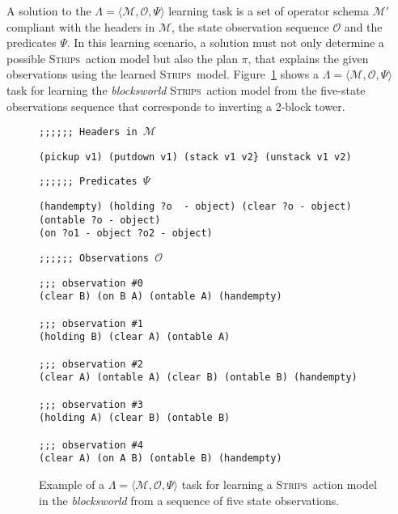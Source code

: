 \documentclass[3p,times]{elsarticle}
\newcommand{\strips}{\textsc{Strips}}     %
\newcommand{\tup}[1]{{\langle #1 \rangle}}
\begin{document}
A solution to the $\Lambda=\tup{\mathcal{M},\mathcal{O},\Psi}$ learning task is a set of operator schema $\mathcal{M}'$ compliant with the headers in $\mathcal{M}$, the state observation sequence $\mathcal{O}$ and the predicates $\Psi$. In this learning scenario, a solution must not only determine a possible \strips\ action model but also the plan $\pi$, that explains the given observations using the learned \strips\ model. Figure~\ref{fig:example-observations} shows a $\Lambda=\tup{\mathcal{M},\mathcal{O},\Psi}$ task for learning the {\em blocksworld} \strips\ action model from the five-state observations sequence that corresponds to inverting a 2-block tower.

\begin{figure}[hbt!]
{\footnotesize\tt ;;;;;; Headers in $\mathcal{M}$}
\begin{footnotesize}
\begin{verbatim}
(pickup v1) (putdown v1) (stack v1 v2} (unstack v1 v2)
\end{verbatim}
\end{footnotesize}
\vspace{0.2cm}
{\footnotesize\tt ;;;;;; Predicates $\Psi$}
\begin{footnotesize}
\begin{verbatim}
(handempty) (holding ?o  - object) (clear ?o - object) (ontable ?o - object)
(on ?o1 - object ?o2 - object)
\end{verbatim}
\end{footnotesize}
\vspace{0.2cm}
{\footnotesize\tt ;;;;;; Observations $\mathcal{O}$}
\begin{footnotesize}
\begin{verbatim}
;;; observation #0
(clear B) (on B A) (ontable A) (handempty)

;;; observation #1
(holding B) (clear A) (ontable A)

;;; observation #2
(clear A) (ontable A) (clear B) (ontable B) (handempty)

;;; observation #3
(holding A) (clear B) (ontable B)

;;; observation #4
(clear A) (on A B) (ontable B) (handempty)
\end{verbatim}
\end{footnotesize}
 \caption{\small Example of a $\Lambda=\tup{\mathcal{M},\mathcal{O},\Psi}$ task for learning a \strips\ action model in the {\em blocksworld} from a sequence of five state observations.}
\label{fig:example-observations}
\end{figure}
\end{document}
